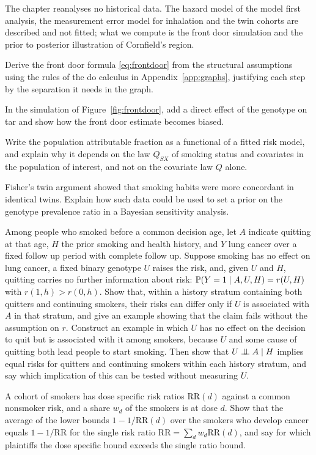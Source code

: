 The chapter reanalyses no historical data. The hazard model of the model first analysis, the measurement error model for inhalation and the twin cohorts are described and not fitted; what we compute is the front door simulation and the prior to posterior illustration of Cornfield's region.

\begin{exercises}
\item\label{ex:ch13:1} Derive the front door formula \eqref{eq:frontdoor} from the structural assumptions using the rules of the do calculus in Appendix~\ref{app:graphs}, justifying each step by the separation it needs in the graph.
\item\label{ex:ch13:2} In the simulation of Figure~\ref{fig:frontdoor}, add a direct effect of the genotype on tar and show how the front door estimate becomes biased.
\item\label{ex:ch13:3} Write the population attributable fraction as a functional of a fitted risk model, and explain why it depends on the law $Q_{SX}$ of smoking status and covariates in the population of interest, and not on the covariate law $Q$ alone.
\item\label{ex:ch13:4} Fisher's twin argument showed that smoking habits were more concordant in identical twins. Explain how such data could be used to set a prior on the genotype prevalence ratio in a Bayesian sensitivity analysis.
\item\label{ex:ch13:5} Among people who smoked before a common decision age, let $A$ indicate quitting at that age, $H$ the prior smoking and health history, and $Y$ lung cancer over a fixed follow up period with complete follow up. Suppose smoking has no effect on lung cancer, a fixed binary genotype $U$ raises the risk, and, given $U$ and $H$, quitting carries no further information about risk: $\mathbb{P}(Y=1\mid A,U,H)=r(U,H)$ with $r(1,h)>r(0,h)$. Show that, within a history stratum containing both quitters and continuing smokers, their risks can differ only if $U$ is associated with $A$ in that stratum, and give an example showing that the claim fails without the assumption on $r$. Construct an example in which $U$ has no effect on the decision to quit but is associated with it among smokers, because $U$ and some cause of quitting both lead people to start smoking. Then show that $U\perp\!\!\!\perp A\mid H$ implies equal risks for quitters and continuing smokers within each history stratum, and say which implication of this can be tested without measuring $U$.
\item\label{ex:ch13:6} A cohort of smokers has dose specific risk ratios $\mathrm{RR}(d)$ against a common nonsmoker risk, and a share $w_d$ of the smokers is at dose $d$. Show that the average of the lower bounds $1 - 1/\mathrm{RR}(d)$ over the smokers who develop cancer equals $1 - 1/\mathrm{RR}$ for the single risk ratio $\mathrm{RR} = \sum_d w_d \mathrm{RR}(d)$, and say for which plaintiffs the dose specific bound exceeds the single ratio bound.
\end{exercises}
